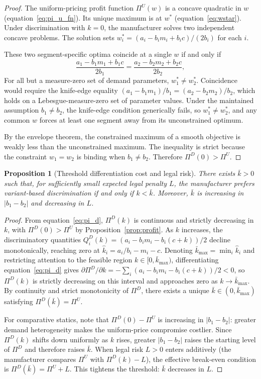 \documentclass[12pt]{article}
\newtheorem{proposition}{Proposition}
\theoremstyle{definition}
\begin{document}
\begin{proof}
The uniform-pricing profit function $\Pi^U(w)$ is a concave quadratic in $w$ (equation~\ref{eq:pi_u_fn}).
Its unique maximum is at $w^*$ (equation~\ref{eq:wstar}).
Under discrimination with $k=0$, the manufacturer solves two independent concave problems. The solution sets $w_i^* = (a_i - b_im_i + b_ic)/(2b_i)$ for each $i$.

These two segment-specific optima coincide at a single $w$ if and only if
\[
\frac{a_1 - b_1 m_1 + b_1 c}{2b_1} = \frac{a_2 - b_2 m_2 + b_2 c}{2b_2},
\]
For all but a measure-zero set of demand parameters, $w_1^* \ne w_2^*$. Coincidence would require the knife-edge equality $(a_1 - b_1 m_1)/b_1 = (a_2 - b_2 m_2)/b_2$, which holds on a Lebesgue-measure-zero set of parameter values. Under the maintained assumption $b_1 \ne b_2$, the knife-edge condition generically fails, so $w_1^* \ne w_2^*$, and any common $w$ forces at least one segment away from its unconstrained optimum.

By the envelope theorem, the constrained maximum of a smooth objective is weakly less than the unconstrained maximum. The inequality is strict because the constraint $w_1 = w_2$ is binding when $b_1 \ne b_2$. Therefore $\Pi^D(0) > \Pi^U$.
\end{proof}

\begin{proposition}[Threshold differentiation cost and legal risk]\label{prop:threshold}
There exists $\bar{k} > 0$ such that, for sufficiently small expected legal penalty $L$, the manufacturer prefers variant-based discrimination if and only if $k < \bar{k}$.
Moreover, $\bar{k}$ is increasing in $|b_1 - b_2|$ and decreasing in $L$.
\end{proposition}

\begin{proof}
From equation~\eqref{eq:pi_d}, $\Pi^D(k)$ is continuous and strictly decreasing in $k$, with $\Pi^D(0) > \Pi^U$ by Proposition~\ref{prop:profit}.
As $k$ increases, the discriminatory quantities $Q_i^D(k) = (a_i - b_i m_i - b_i(c+k))/2$ decline monotonically, reaching zero at $\hat{k}_i = a_i/b_i - m_i - c$. Denoting $\bar{k}_{\max} = \min_i \hat{k}_i$ and restricting attention to the feasible region $k \in [0, \bar{k}_{\max})$, differentiating equation~\ref{eq:pi_d} gives $\partial \Pi^D/\partial k = -\sum_i (a_i - b_i m_i - b_i(c+k))/2 < 0$, so $\Pi^D(k)$ is strictly decreasing on this interval and approaches zero as $k \to \bar{k}_{\max}$.
By continuity and strict monotonicity of $\Pi^D$, there exists a unique $\bar{k} \in (0, \bar{k}_{\max})$ satisfying $\Pi^D(\bar{k}) = \Pi^U$.

For comparative statics, note that $\Pi^D(0) - \Pi^U$ is increasing in $|b_1 - b_2|$: greater demand heterogeneity makes the uniform-price compromise costlier. Since $\Pi^D(k)$ shifts down uniformly as $k$ rises, greater $|b_1 - b_2|$ raises the starting level of $\Pi^D$ and therefore raises $\bar{k}$.
When legal risk $L > 0$ enters additively (the manufacturer compares $\Pi^U$ with $\Pi^D(k) - L$), the effective break-even condition is $\Pi^D(\bar{k}) = \Pi^U + L$. This tightens the threshold: $\bar{k}$ decreases in $L$.
\end{proof}
\end{document}
